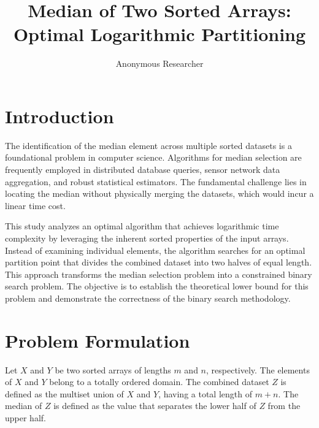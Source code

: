 \documentclass[10pt,journal,compsoc]{IEEEtran}
\begin{document}
\title{Median of Two Sorted Arrays: Optimal Logarithmic Partitioning}

\author{ Anonymous Researcher }


\maketitle
\IEEEdisplaynontitleabstractindextext
\IEEEpeerreviewmaketitle

\section{Introduction}

The identification of the median element across multiple sorted datasets is a foundational problem in computer science. Algorithms for median selection are frequently employed in distributed database queries, sensor network data aggregation, and robust statistical estimators. The fundamental challenge lies in locating the median without physically merging the datasets, which would incur a linear time cost.

This study analyzes an optimal algorithm that achieves logarithmic time complexity by leveraging the inherent sorted properties of the input arrays. Instead of examining individual elements, the algorithm searches for an optimal partition point that divides the combined dataset into two halves of equal length. This approach transforms the median selection problem into a constrained binary search problem. The objective is to establish the theoretical lower bound for this problem and demonstrate the correctness of the binary search methodology.

\section{Problem Formulation}
Let $X$ and $Y$ be two sorted arrays of lengths $m$ and $n$, respectively. The elements of $X$ and $Y$ belong to a totally ordered domain. The combined dataset $Z$ is defined as the multiset union of $X$ and $Y$, having a total length of $m + n$. The median of $Z$ is defined as the value that separates the lower half of $Z$ from the upper half.
\end{document}
